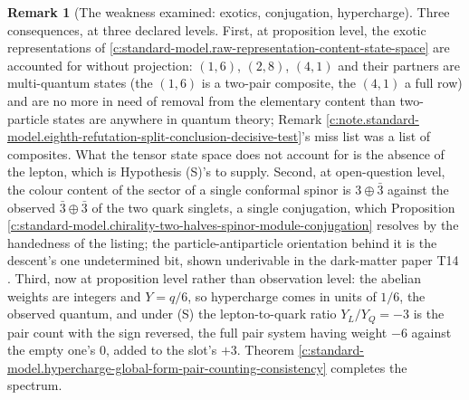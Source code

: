 \documentclass[11pt]{article}
\theoremstyle{definition}
\newtheorem{remark}[theorem]{Remark}
\theoremstyle{plain}
\newcommand{\changedmark}[2]{\marginpar{\raggedright\scriptsize\color{#1}#2}}
\begin{document}
\begin{remark}[The weakness examined: exotics, conjugation, hypercharge]\label{c:note.standard-model.weakness-examined-exotics-conjugation-hypercharge}
\changedmark{gray}{reworded}
Three consequences, at three declared levels. First, at proposition level, the exotic representations of \ref{c:standard-model.raw-representation-content-state-space} are accounted for without projection: $(1,6)$, $(2,8)$, $(4,1)$ and their partners are multi-quantum states (the $(1,6)$ is a two-pair composite, the $(4,1)$ a full row) and are no more in need of removal from the elementary content than two-particle states are anywhere in quantum theory; Remark \ref{c:note.standard-model.eighth-refutation-split-conclusion-decisive-test}'s miss list was a list of composites. What the tensor state space does not account for is the absence of the lepton, which is Hypothesis (S)'s to supply. Second, at open-question level, the colour content of the sector of a single conformal spinor is $3 \oplus \bar{3}$ against the observed $\bar{3} \oplus \bar{3}$ of the two quark singlets, a single conjugation, which Proposition \ref{c:standard-model.chirality-two-halves-spinor-module-conjugation} resolves by the handedness of the listing; the particle-antiparticle orientation behind it is the descent's one undetermined bit, shown underivable in the dark-matter paper T14 \cite[Prop.~5.2]{ButlerT14}. Third, now at proposition level rather than observation level: the abelian weights are integers and $Y = q/6$, so hypercharge comes in units of $1/6$, the observed quantum, and under (S) the lepton-to-quark ratio $Y_{L}/Y_{Q} = -3$ is the pair count with the sign reversed, the full pair system having weight $-6$ against the empty one's $0$, added to the slot's $+3$. Theorem \ref{c:standard-model.hypercharge-global-form-pair-counting-consistency} completes the spectrum.
\end{remark}
\end{document}
